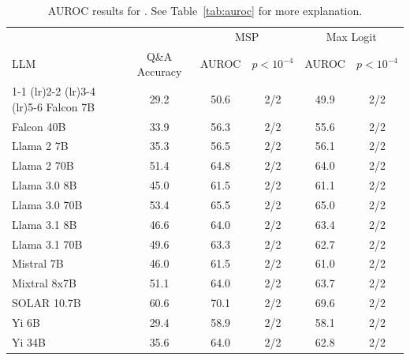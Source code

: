 \begin{table}[h]
\caption{AUROC results for . See Table~\ref{tab:auroc} for more explanation.}
\label{tab:auroc_margin}
\centering
\begin{tabular}{lccccc}
\toprule
& & \multicolumn{2}{c}{MSP} & \multicolumn{2}{c}{Max Logit} \\ 
LLM & Q\&A Accuracy & AUROC & $p < 10^{-4}$ & AUROC & $p < 10^{-4}$ \\ 
\cmidrule(lr){1-1} \cmidrule(lr){2-2} \cmidrule(lr){3-4} \cmidrule(lr){5-6} 
Falcon 7B & 29.2 & 50.6 & 2/2 & 49.9 & 2/2\\
Falcon 40B & 33.9 & 56.3 & 2/2 & 55.6 & 2/2\\
Llama 2 7B & 35.3 & 56.5 & 2/2 & 56.1 & 2/2\\
Llama 2 70B & 51.4 & 64.8 & 2/2 & 64.0 & 2/2\\
Llama 3.0 8B & 45.0 & 61.5 & 2/2 & 61.1 & 2/2\\
Llama 3.0 70B & 53.4 & 65.5 & 2/2 & 65.0 & 2/2\\
Llama 3.1 8B & 46.6 & 64.0 & 2/2 & 63.4 & 2/2\\
Llama 3.1 70B & 49.6 & 63.3 & 2/2 & 62.7 & 2/2\\
Mistral 7B & 46.0 & 61.5 & 2/2 & 61.0 & 2/2\\
Mixtral 8x7B & 51.1 & 64.0 & 2/2 & 63.7 & 2/2\\
SOLAR 10.7B & 60.6 & 70.1 & 2/2 & 69.6 & 2/2\\
Yi 6B & 29.4 & 58.9 & 2/2 & 58.1 & 2/2\\
Yi 34B & 35.6 & 64.0 & 2/2 & 62.8 & 2/2\\
\bottomrule
\end{tabular}
\end{table}
